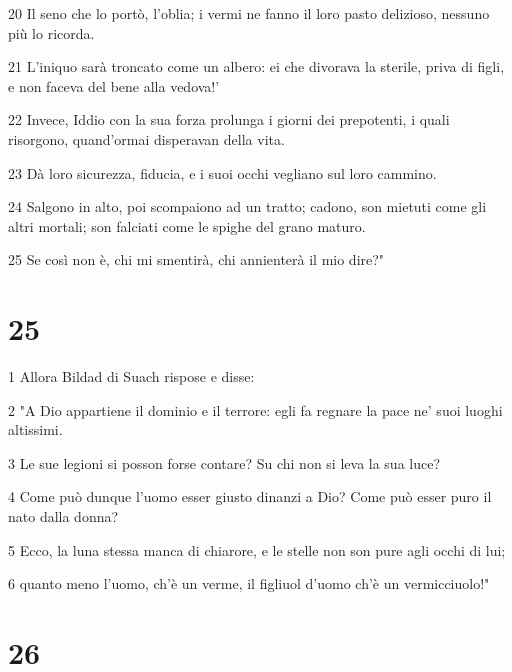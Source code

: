 \par 20 Il seno che lo portò, l'oblia; i vermi ne fanno il loro pasto delizioso, nessuno più lo ricorda.
\par 21 L'iniquo sarà troncato come un albero: ei che divorava la sterile, priva di figli, e non faceva del bene alla vedova!'
\par 22 Invece, Iddio con la sua forza prolunga i giorni dei prepotenti, i quali risorgono, quand'ormai disperavan della vita.
\par 23 Dà loro sicurezza, fiducia, e i suoi occhi vegliano sul loro cammino.
\par 24 Salgono in alto, poi scompaiono ad un tratto; cadono, son mietuti come gli altri mortali; son falciati come le spighe del grano maturo.
\par 25 Se così non è, chi mi smentirà, chi annienterà il mio dire?"

\chapter{25}

\par 1 Allora Bildad di Suach rispose e disse:
\par 2 "A Dio appartiene il dominio e il terrore: egli fa regnare la pace ne' suoi luoghi altissimi.
\par 3 Le sue legioni si posson forse contare? Su chi non si leva la sua luce?
\par 4 Come può dunque l'uomo esser giusto dinanzi a Dio? Come può esser puro il nato dalla donna?
\par 5 Ecco, la luna stessa manca di chiarore, e le stelle non son pure agli occhi di lui;
\par 6 quanto meno l'uomo, ch'è un verme, il figliuol d'uomo ch'è un vermicciuolo!"

\chapter{26}

